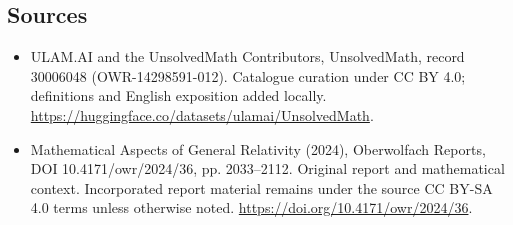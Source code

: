 \documentclass[11pt]{article}
\begin{document}
\subsection{Sources}
\begin{itemize}
\item[\hypertarget{source:30006048:1}{S1}] ULAM.AI and the UnsolvedMath Contributors, UnsolvedMath, record 30006048 (OWR-14298591-012). Catalogue curation under CC BY 4.0; definitions and English exposition added locally.
\url{https://huggingface.co/datasets/ulamai/UnsolvedMath}.
\item[\hypertarget{source:30006048:2}{S2}] Mathematical Aspects of General Relativity (2024), Oberwolfach Reports, DOI 10.4171/owr/2024/36, pp. 2033--2112. Original report and mathematical context. Incorporated report material remains under the source CC BY-SA 4.0 terms unless otherwise noted.
\url{https://doi.org/10.4171/owr/2024/36}.
\end{itemize}
\label{end:30006048}
\end{document}
